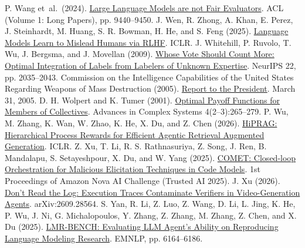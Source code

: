 \begin{thebibliography}{}
 P. Wang et~al.\ (2024). \href{https://doi.org/10.18653/v1/2024.acl-long.511}{Large Language Models are not Fair Evaluators}. ACL (Volume 1: Long Papers), pp. 9440--9450.
 J. Wen, R. Zhong, A. Khan, E. Perez, J. Steinhardt, M. Huang, S. R. Bowman, H. He, and S. Feng (2025). \href{https://arxiv.org/abs/2409.12822}{Language Models Learn to Mislead Humans via RLHF}. ICLR.
 J. Whitehill, P. Ruvolo, T. Wu, J. Bergsma, and J. Movellan (2009). \href{https://proceedings.neurips.cc/paper/2009/hash/f899139df5e1059396431415e770c6dd-Abstract.html}{Whose Vote Should Count More: Optimal Integration of Labels from Labelers of Unknown Expertise}. NeurIPS 22, pp. 2035--2043.
 Commission on the Intelligence Capabilities of the United States Regarding Weapons of Mass Destruction (2005). \href{https://govinfo.library.unt.edu/wmd/report/index.html}{Report to the President}. March 31, 2005.
 D. H. Wolpert and K. Tumer (2001). \href{https://doi.org/10.1142/S0219525901000188}{Optimal Payoff Functions for Members of Collectives}. Advances in Complex Systems 4(2--3):265--279.
 P. Wu, M. Zhang, K. Wan, W. Zhao, K. He, X. Du, and Z. Chen (2026). \href{https://proceedings.iclr.cc/paper_files/paper/2026/hash/85255cf8f2d2318cc7cffd0b1bc66625-Abstract-Conference.html}{HiPRAG: Hierarchical Process Rewards for Efficient Agentic Retrieval Augmented Generation}. ICLR.
 Z. Xu, T. Li, R. S. Rathnasuriya, Z. Song, J. Ren, B. Mandalapu, S. Setayeshpour, X. Du, and W. Yang (2025). \href{https://www.amazon.science/nova-ai-challenge/proceedings/comet-closed-loop-orchestration-for-malicious-elicitation-techniques-in-code-models}{COMET: Closed-loop Orchestration for Malicious Elicitation Techniques in Code Models}. 1st Proceedings of Amazon Nova AI Challenge (Trusted AI 2025).
 J. Xu (2026). \href{https://arxiv.org/abs/2609.28564}{Don't Read the Log: Execution Traces Contaminate Verifiers in Video-Generation Agents}. arXiv:2609.28564.
 S. Yan, R. Li, Z. Luo, Z. Wang, D. Li, L. Jing, K. He, P. Wu, J. Ni, G. Michalopoulos, Y. Zhang, Z. Zhang, M. Zhang, Z. Chen, and X. Du (2025). \href{https://doi.org/10.18653/v1/2025.emnlp-main.314}{LMR-BENCH: Evaluating LLM Agent's Ability on Reproducing Language Modeling Research}. EMNLP, pp. 6164--6186.

\end{thebibliography}
